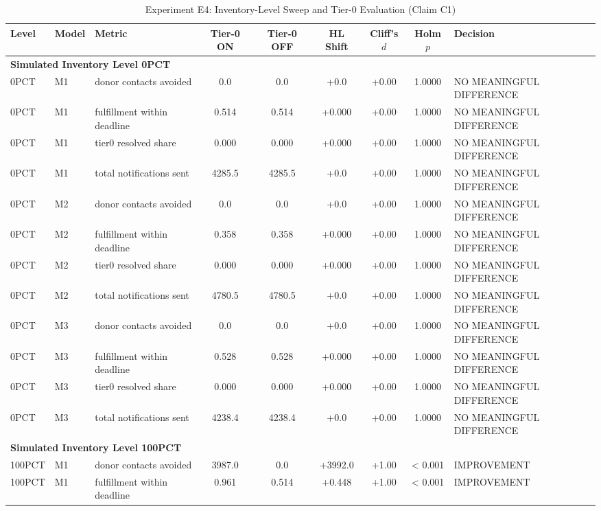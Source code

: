 \begin{table}[t]
\centering
\small
\caption{Experiment E4: Inventory-Level Sweep and Tier-0 Evaluation (Claim C1)}
\label{tab:e4_inventory}
\begin{tabular}{lllcccccl}
\toprule
Level & Model & Metric & Tier-0 ON & Tier-0 OFF & HL Shift & Cliff's $d$ & Holm $p$ & Decision \\
\midrule
\multicolumn{9}{l}{\textbf{Simulated Inventory Level 0PCT}} \\
\midrule
0PCT & M1 & donor contacts avoided & 0.0 & 0.0 & +0.0 & +0.00 & 1.0000 & NO MEANINGFUL DIFFERENCE \\
0PCT & M1 & fulfillment within deadline & 0.514 & 0.514 & +0.000 & +0.00 & 1.0000 & NO MEANINGFUL DIFFERENCE \\
0PCT & M1 & tier0 resolved share & 0.000 & 0.000 & +0.000 & +0.00 & 1.0000 & NO MEANINGFUL DIFFERENCE \\
0PCT & M1 & total notifications sent & 4285.5 & 4285.5 & +0.0 & +0.00 & 1.0000 & NO MEANINGFUL DIFFERENCE \\
0PCT & M2 & donor contacts avoided & 0.0 & 0.0 & +0.0 & +0.00 & 1.0000 & NO MEANINGFUL DIFFERENCE \\
0PCT & M2 & fulfillment within deadline & 0.358 & 0.358 & +0.000 & +0.00 & 1.0000 & NO MEANINGFUL DIFFERENCE \\
0PCT & M2 & tier0 resolved share & 0.000 & 0.000 & +0.000 & +0.00 & 1.0000 & NO MEANINGFUL DIFFERENCE \\
0PCT & M2 & total notifications sent & 4780.5 & 4780.5 & +0.0 & +0.00 & 1.0000 & NO MEANINGFUL DIFFERENCE \\
0PCT & M3 & donor contacts avoided & 0.0 & 0.0 & +0.0 & +0.00 & 1.0000 & NO MEANINGFUL DIFFERENCE \\
0PCT & M3 & fulfillment within deadline & 0.528 & 0.528 & +0.000 & +0.00 & 1.0000 & NO MEANINGFUL DIFFERENCE \\
0PCT & M3 & tier0 resolved share & 0.000 & 0.000 & +0.000 & +0.00 & 1.0000 & NO MEANINGFUL DIFFERENCE \\
0PCT & M3 & total notifications sent & 4238.4 & 4238.4 & +0.0 & +0.00 & 1.0000 & NO MEANINGFUL DIFFERENCE \\
\midrule
\multicolumn{9}{l}{\textbf{Simulated Inventory Level 100PCT}} \\
\midrule
100PCT & M1 & donor contacts avoided & 3987.0 & 0.0 & +3992.0 & +1.00 & < 0.001 & IMPROVEMENT \\
100PCT & M1 & fulfillment within deadline & 0.961 & 0.514 & +0.448 & +1.00 & < 0.001 & IMPROVEMENT \\

\end{tabular}
\end{table}

